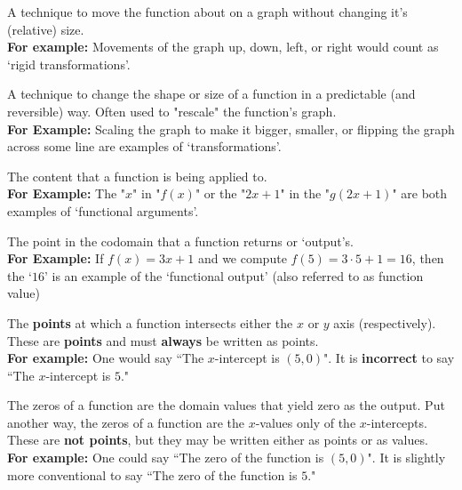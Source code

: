 \documentclass{ximeraXloud}
\begin{document}
\begin{definition}
    A technique to move the function about on a graph without changing it's (relative) size. \\
    \textbf{For example:} Movements of the graph up, down, left, or right would count as `rigid transformations'.
\end{definition}

\begin{definition}[Transformation]
    A technique to change the shape or size of a function in a predictable (and reversible) way. Often used to "rescale" the function's graph.\\
    \textbf{For Example:} Scaling the graph to make it bigger, smaller, or flipping the graph across some line are examples of `transformations'.
\end{definition}

\begin{definition}
    The content that a function is being applied to.\\
    \textbf{For Example:} The "$x$" in "$f(x)$" or the "$2x+1$" in the "$g(2x+1)$" are both examples of `functional arguments'.
\end{definition}

\begin{definition}
    The point in the codomain that a function returns or `output's.\\
    \textbf{For Example:} If $f(x) = 3x+1$ and we compute $f(5) = 3\cdot5 + 1 = 16$, then the `$16$' is an example of the `functional output' (also referred to as function value)
\end{definition}

\begin{definition}[(x or y) intercept(s)]
    The \textbf{points} at which a function intersects either the $x$ or $y$ axis (respectively). These are \textbf{points} and must \textbf{always} be written as points. \\
    \textbf{For example:} One would say ``The $x$-intercept is $(5,0)$". It is \textbf{incorrect} to say ``The $x$-intercept is $5$."
\end{definition}

\begin{definition}
    The zeros of a function are the domain values that yield zero as the output. Put another way, the zeros of a function are the $x$-values only of the $x$-intercepts. These are \textbf{not points}, but they may be written either as points or as values.\\
    \textbf{For example:} One could say ``The zero of the function is $(5,0)$". It is slightly more conventional to say ``The zero of the function is $5$."
\end{definition}
\end{document}
